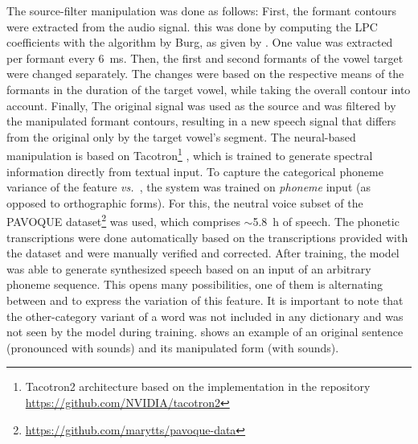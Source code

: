 The source-filter manipulation was done as follows:
First, the formant contours were extracted from the audio signal.
this was done by computing the LPC coefficients with the algorithm by Burg, as given by \citet{Press1989numerical}.
One value was extracted per formant every \SI{6}{\milli\second}.
Then, the first and second formants of the vowel target were changed separately.
The changes were based on the respective means of the formants in the duration of the target vowel, while taking the overall contour into account.
Finally, The original signal was used as the source and was filtered by the manipulated formant contours, resulting in a new speech signal that differs from the original only by the target vowel's segment.
The neural-based manipulation is based on Tacotron\footnote{Tacotron2 architecture based on the implementation in the repository \url{https://github.com/NVIDIA/tacotron2}} \citep{Shen2018natural}, which is trained to generate spectral information directly from textual input.
To capture the categorical phoneme variance of the feature \emph{\textipa{[\c{c}]} vs.\ \textipa{[k]}}, the system was trained on \emph{phoneme} input (as opposed to orthographic forms).
For this, the neutral voice subset of the PAVOQUE dataset\footnote{\url{https://github.com/marytts/pavoque-data}} \citep{Steiner2013pavoque} was used, which comprises $\sim$\SI{5.8}{\hour} of speech.
The phonetic transcriptions were done automatically based on the transcriptions provided with the dataset and were manually verified and corrected.
After training, the model was able to generate synthesized speech based on an input of an arbitrary phoneme sequence.
This opens many possibilities, one of them is alternating between \textipa{[\c{c}]} and \textipa{[k]} to express the variation of this feature.
It is important to note that the other-category variant of a word was not included in any dictionary and was not seen by the model during training.
 shows an example of an original sentence (pronounced with \textipa{[\c{c}]} sounds) and its manipulated form (with \textipa{[k]} sounds).
%
